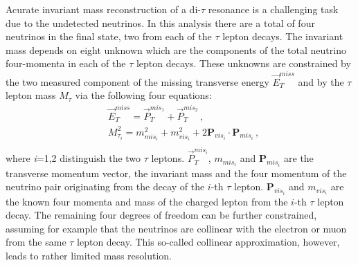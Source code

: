 Acurate invariant mass reconstruction of a di-$\tau$ resonance is a challenging task due to the undetected neutrinos. 
In this analysis there are a total of four neutrinos in the final state, two from  each 
of the $\tau$ lepton decays.
The invariant mass depends on eight unknown which are the components of the total neutrino four-momenta 
in each of the $\tau$ lepton decays. These unknowns are  constrained by the two measured component of the 
 missing transverse energy $\vec{E}_T^{miss}$ and by  the $\tau$ lepton mass $M_{\tau}$ via the following four equations:
% 
\begin{equation} \label{eq:MMC}
\begin{split}
&\vec{E}_T^{miss} = \vec{P}_{T}^{mis_{1}} +  \vec{P}_{T}^{mis_2} \,,\\
&M_{\tau_{i}}^2 = m^2_{mis_{i}} + m^2_{vis_{i}} + 2 \mathbf{P}_{vis_i} \cdot \mathbf{P}_{mis_i} \,, \\
\end{split}
\end{equation}
where \emph{i}=1,2 distinguish the two $\tau$ leptons.
$\vec{P}_{T}^{mis_{i}}$, $m_{mis_{i}}$ and $\mathbf{P}_{mis_{i}}$ are the transverse momentum vector, the invariant mass and 
the four momentum of the neutrino pair originating from the decay of the $i$-th  $\tau$ 
lepton. $\mathbf{P}_{vis_i}$ and $m_{vis_{i}}$ are the known four momenta and mass of the charged lepton from the $i$-th $\tau$ lepton decay.
The remaining four degrees of freedom can be 
further constrained, assuming for example that the neutrinos are collinear with the electron or muon from the same 
$\tau$ lepton decay. This so-called collinear approximation, however, leads to  rather limited  mass resolution.


